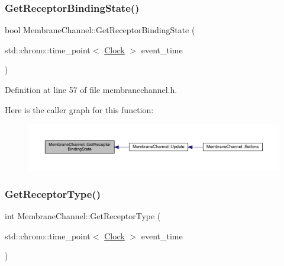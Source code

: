 \subsubsection{\texorpdfstring{Get\+Receptor\+Binding\+State()}{GetReceptorBindingState()}}
{\footnotesize\ttfamily bool Membrane\+Channel\+::\+Get\+Receptor\+Binding\+State (\begin{DoxyParamCaption}\item[{std\+::chrono\+::time\+\_\+point$<$ \hyperlink{universe_8h_a0ef8d951d1ca5ab3cfaf7ab4c7a6fd80}{Clock} $>$}]{event\+\_\+time }\end{DoxyParamCaption})\hspace{0.3cm}{\ttfamily [inline]}}



Definition at line 57 of file membranechannel.\+h.

Here is the caller graph for this function\+:\nopagebreak
\begin{figure}[H]
\begin{center}
\leavevmode
\includegraphics[width=350pt]{class_membrane_channel_a8eb115e2583e5bf0f37156f1fc974aa6_icgraph}
\end{center}
\end{figure}
\mbox{\label{class_membrane_channel_aa37056ebb4e757a5ed00252112b516aa}} 
\subsubsection{\texorpdfstring{Get\+Receptor\+Type()}{GetReceptorType()}}
{\footnotesize\ttfamily int Membrane\+Channel\+::\+Get\+Receptor\+Type (\begin{DoxyParamCaption}\item[{std\+::chrono\+::time\+\_\+point$<$ \hyperlink{universe_8h_a0ef8d951d1ca5ab3cfaf7ab4c7a6fd80}{Clock} $>$}]{event\+\_\+time }\end{DoxyParamCaption})\hspace{0.3cm}{\ttfamily [inline]}}



